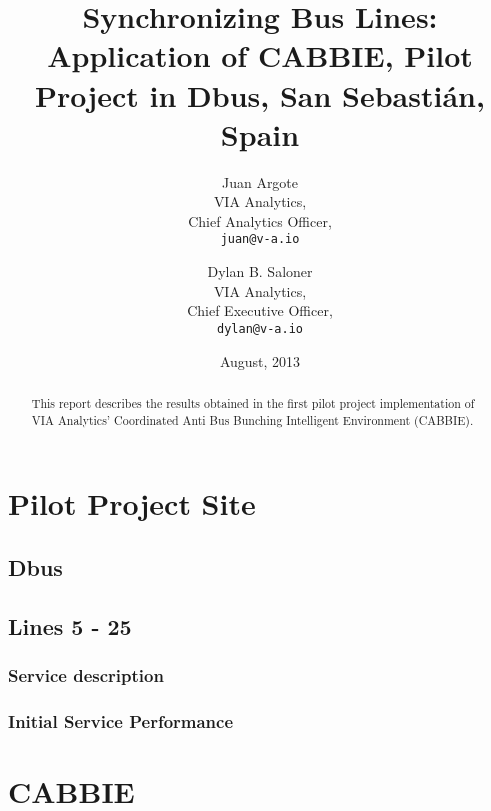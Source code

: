 \documentclass[11pt,letterpaper,]{report}
\begin{document}
\title{Synchronizing Bus Lines: Application of CABBIE, Pilot Project in Dbus, San Sebasti\'{a}n, Spain}
\author{Juan Argote\\
	VIA Analytics,\\
	Chief Analytics Officer,\\
	\texttt{juan@v-a.io} \and Dylan B. Saloner\\
	VIA Analytics,\\
	Chief Executive Officer,\\
	\texttt{dylan@v-a.io}}
\date{August, 2013}
\maketitle	

\renewcommand{\abstractname}{Executive Summary}
\begin{abstract}
This report describes the results obtained in the first pilot project implementation of VIA Analytics' Coordinated Anti Bus Bunching Intelligent Environment (CABBIE). 

\end{abstract}

\tableofcontents

\listoffigures
\listoftables

\chapter{Pilot Project Site}

\section{Dbus}

\section{Lines 5 - 25}

\subsection{Service description}

\subsection{Initial Service Performance}

\chapter{CABBIE}
\end{document}
